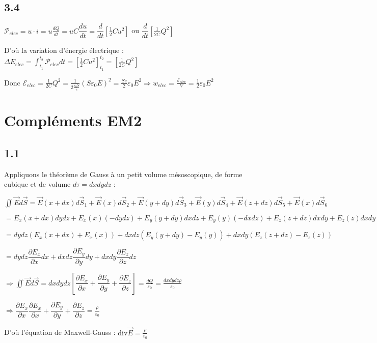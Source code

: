 \documentclass[a4paper,12pt]{book}
\begin{document}
\subsection{3.4}
$\mathcal{P}_{elec} = u\cdot i = u\frac{dQ}{dt}=uC\dfrac{du}{dt}=\dfrac{d}{dt}\left[\frac{1}{2}Cu^2\right]$ ou $\dfrac{d}{dt}\left[\frac{1}{2C}Q^2\right]$
\par D'où la variation d'énergie électrique : $\Delta E_{elec}=\int_{t_1}^{t_2}\mathcal{P}_{elec}dt = \left[\frac{1}{2}Cu^2\right]_{t_1}^{t_2} =\left[\frac{1}{2C}Q^2\right]$
\par Donc $\mathcal{E}_{elec} = \frac{1}{2C}Q^2 = \frac{1}{2\frac{\varepsilon_0S}{e}}(S\varepsilon_0E)^2 = \frac{Se}{2}\varepsilon_0E^2 \Rightarrow w_{elec}=\frac{\mathcal{E}_{elec}}{V}=\frac{1}{2}\varepsilon_0E^2$


\section{Compléments EM2}
\subsection{1.1}
Appliquons le théorème de Gauss à un petit volume mésoscopique, de forme cubique et de volume $d\tau = dxdydz$ :
\par $\iint\vec{E}d\vec{S}=\vec{E}(x+dx)d\vec{S}_1 + \vec{E}(x)d\vec{S}_2 +\vec{E}(y+dy)d\vec{S}_3 + \vec{E}(y)d\vec{S}_4 +\vec{E}(z+dz)d\vec{S}_5 + \vec{E}(x)d\vec{S}_6$ \par $ = E_x(x+dx)dydz + E_x(x)(-dydz) +E_y(y+dy)dxdz + E_y(y)(-dxdz)+E_z(z+dz)dxdy+E_z(z)dxdy$ \par $ =dydz(E_x(x+dx)+E_x(x))+dxdz(E_y(y+dy)-E_y(y))+dxdy(E_z(z+dz)-E_z(z))$ \par $=dydz\dfrac{\partial E_x}{\partial x}dx+dxdz\dfrac{\partial E_y}{\partial y}dy+dxdy\dfrac{\partial E_z}{\partial z}dz$
\par $\Rightarrow \iint\vec{E}d\vec{S}=dxdydz\left[\dfrac{\partial E_x}{\partial x}+\dfrac{\partial E_y}{\partial y}+\dfrac{\partial E_z}{\partial z}\right]=\frac{dQ}{\varepsilon_0}=\frac{dxdydz\rho}{\varepsilon_0}$ \par $\Rightarrow \dfrac{\partial E_x}{\partial x}\dfrac{\partial E_x}{\partial x}+\dfrac{\partial E_y}{\partial y}+\dfrac{\partial E_z}{\partial z}=\frac{\rho}{\varepsilon_0}$
\par D'où l'équation de Maxwell-Gauss : $\mathrm{div}\vec{E}=\frac{\rho}{\varepsilon_0}$
\end{document}
